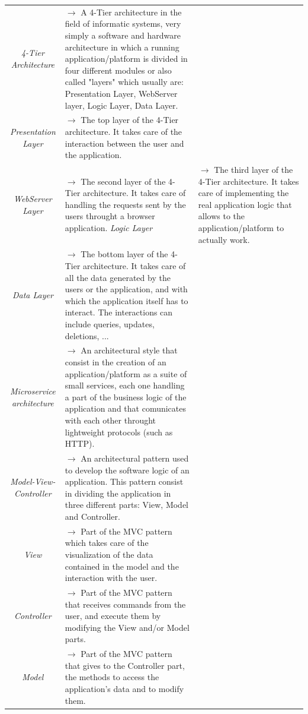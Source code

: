 \documentclass{article}
\begin{document}
{\begin{xltabular}{\textwidth}{ >{\raggedright\arraybackslash}c >{\raggedright\arraybackslash}X }
    \textit{4-Tier Architecture} & $\rightarrow$ A 4-Tier architecture in the field of informatic systems, very simply
    a software and hardware architecture in which a running application/platform is divided in four different modules
    or also called "layers" which usually are: Presentation Layer, WebServer layer, Logic Layer, Data Layer. \\
    \textit{Presentation Layer} & $\rightarrow$ The top layer of the 4-Tier architecture. It takes care of the interaction
    between the user and the application.\\
    \textit{WebServer Layer} & $\rightarrow$ The second layer of the 4-Tier architecture. It takes care of handling the requests
    sent by the users throught a browser application.
    \textit{Logic Layer} & $\rightarrow$ The third layer of the 4-Tier architecture. It takes care of implementing the real
    application logic that allows to the application/platform to actually work. \\
    \textit{Data Layer} & $\rightarrow$ The bottom layer of the 4-Tier architecture. It takes care of all the data generated
    by the users or the application, and with which the application itself has to interact. The interactions
    can include queries, updates, deletions, ... \\
    \textit{Microservice architecture} & $\rightarrow$ An architectural style that consist in the creation of an
    application/platform as a suite of small services, each one handling a part of the business logic of the application
    and that comunicates with each other throught lightweight protocols (such as HTTP). \\
    \textit{Model-View-Controller} & $\rightarrow$ An architectural pattern used to develop the
    software logic of an application. This pattern consist in dividing the application in three
    different parts: View, Model and Controller. \\
    \textit{View} & $\rightarrow$ Part of the MVC pattern which takes care of the visualization of the
    data contained in the model and the interaction with the user. \\
    \textit{Controller} & $\rightarrow$ Part of the MVC pattern that receives commands from the user, and execute them
    by modifying the View and/or Model parts. \\
    \textit{Model} & $\rightarrow$ Part of the MVC pattern that gives to the Controller part, the
    methods to access the application's data and to modify them.
\end{xltabular}

}
\end{document}
